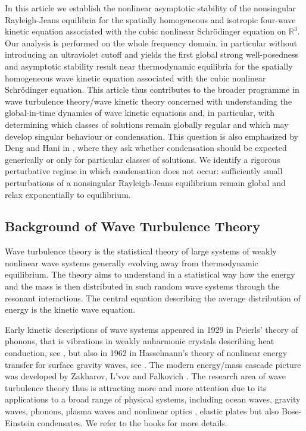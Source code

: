 \documentclass[reqno,11pt,letterpaper]{amsart}
\numberwithin{equation}{section}
\newcommand{\R}{\mathbb{R}}
\begin{document}
In this article we establish the nonlinear asymptotic stability of the nonsingular Rayleigh-Jeans equilibria for the spatially homogeneous and isotropic four-wave kinetic equation associated with the cubic nonlinear Schr\"odinger equation on $\mathbb{R}^3$. 
Our analysis is performed on the
whole frequency domain, in particular without introducing an ultraviolet cutoff and yields the first global strong well-posedness and asymptotic stability result near thermodynamic equilibria for the spatially homogeneous wave kinetic equation associated with the cubic nonlinear Schr\"odinger equation. 
This article thus contributes to the broader programme in wave turbulence theory/wave kinetic theory concerned with understanding the global-in-time dynamics of wave kinetic equations and, in particular, with determining which classes of solutions remain globally regular and which may develop singular behaviour or condensation. 
This question is also emphasized by Deng and Hani in \cite[Section 1.5.3]{DengHani3}, where they ask whether condensation should be expected generically or only for particular classes of solutions. We identify a rigorous perturbative regime in which condensation does not occur: sufficiently small perturbations of a nonsingular Rayleigh-Jeans equilibrium remain global and relax exponentially to equilibrium.

\vspace{-0.5cm}

\subsection{Background of Wave Turbulence Theory}  
Wave turbulence theory is the statistical theory of large systems of weakly nonlinear wave systems generally evolving away from thermodynamic equilibrium. 
The theory aims to understand in a statistical way how the energy and the mass is then distributed in such random wave systems through the resonant interactions. The central equation describing the average distribution of energy is the kinetic wave equation. 

Early kinetic descriptions of wave systems appeared in 1929 in Peierls' theory of phonons, that is vibrations in weakly anharmonic crystals describing heat conduction, see \cite{Peierls1929}, but also in 1962 in Hasselmann's theory of nonlinear energy transfer for surface gravity waves, see \cite{Hasselmann:1962, Hasselmann1963}. The modern energy/mass  cascade picture was developed by Zakharov, L'vov and Falkovich \cite{ZakLvovFalkov}. The research area of wave turbulence theory thus is attracting more and more  attention due to its applications to a broad range of physical systems, including ocean waves,  gravity waves, phonons, plasma waves and nonlinear optics \cite{Dyachenko:1992}, elastic plates \cite{During:2017} but also Bose-Einstein condensates. We refer to the books \cite{Nazarenko, NewellRumpf, Zakharov98} for more details.
\end{document}
